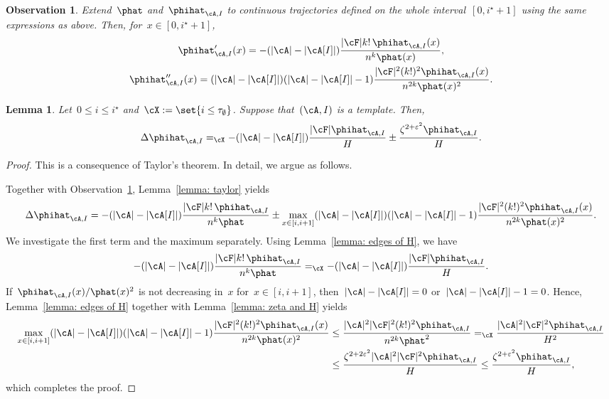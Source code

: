 \documentclass[11pt]{amsart}
\newcommand{\eps}{\varepsilon}
\DeclarePairedDelimiter{\abs}{\lvert}{\rvert}
\newcommand{\Xeq}{=_{\cX}}
\newtheorem{lemma}[algocf]{Lemma}
\newtheorem{observation}[algocf]{Observation}
\theoremstyle{definition}
\numberwithin{equation}{section}
\begin{document}
	
	\begin{observation}\label{observation: derivative phihat}
		Extend~$\phat$ and~$\phihat_{\cA,I}$ to continuous trajectories defined on the whole interval~$[0,i^\star+1]$ using the same expressions as above.
		Then, for~$x\in [0,i^\star+1]$,
		\begin{equation*}
			\begin{gathered}
				\phihat_{\cA,I}'(x)=-(\abs{\cA}-\abs{\cA[I]})\frac{\abs{\cF}k!\,\phihat_{\cA,I}(x)}{n^k\phat(x)},\\
				\phihat_{\cA,I}''(x)=(\abs{\cA}-\abs{\cA[I]})(\abs{\cA}-\abs{\cA[I]}-1)\frac{\abs{\cF}^2(k!)^2\phihat_{\cA,I}(x)}{n^{2k}\phat(x)^2}.
			\end{gathered}
		\end{equation*} 
	\end{observation}
	
	\begin{lemma}\label{lemma: delta phihat}
		Let~$0\leq i\leq i^\star$ and~$\cX:=\set{i\leq \tau_\emptyset}$.
		Suppose that~$(\cA,I)$ is a template.
		Then,
		\begin{equation*}
			\Delta \phihat_{\cA,I}\Xeq -(\abs{\cA}-\abs{\cA[I]})\frac{\abs{\cF}\phihat_{\cA,I}}{H}\pm \frac{\zeta^{2+\eps^2}\phihat_{\cA,I}}{H}.
		\end{equation*}
	\end{lemma}
	
	\begin{proof}
		This is a consequence of Taylor's theorem.
		In detail, we argue as follows.
		
		Together with Observation~\ref{observation: derivative phihat}, Lemma~\ref{lemma: taylor} yields
		\begin{equation*}
			\Delta\phihat_{\cA,I}
			=-(\abs{\cA}-\abs{\cA[I]})\frac{\abs{\cF}k!\,\phihat_{\cA,I}}{n^k\phat}\pm \max_{x\in[i,i+1]}(\abs{\cA}-\abs{\cA[I]})(\abs{\cA}-\abs{\cA[I]}-1)\frac{\abs{\cF}^2(k!)^2\phihat_{\cA,I}(x)}{n^{2k}\phat(x)^2}.
		\end{equation*}
		We investigate the first term and the maximum separately.
		Using Lemma~\ref{lemma: edges of H}, we have
		\begin{equation*}
			-(\abs{\cA}-\abs{\cA[I]})\frac{\abs{\cF}k!\,\phihat_{\cA,I}}{n^k\phat}
			\Xeq-(\abs{\cA}-\abs{\cA[I]})\frac{\abs{\cF}\phihat_{\cA,I}}{H}.
		\end{equation*}
		If~$\phihat_{\cA,I}(x)/\phat(x)^2$ is not decreasing in~$x$ for~$x\in[i,i+1]$, then~$\abs{\cA}-\abs{\cA[I]}=0$ or~$\abs{\cA}-\abs{\cA[I]}-1=0$.
		Hence, Lemma~\ref{lemma: edges of H} together with Lemma~\ref{lemma: zeta and H} yields
		\begin{align*}
			\max_{x\in[i,i+1]}(\abs{\cA}-\abs{\cA[I]})(\abs{\cA}-\abs{\cA[I]}-1)\frac{\abs{\cF}^2(k!)^2\phihat_{\cA,I}(x)}{n^{2k}\phat(x)^2}
			&\leq \frac{\abs{\cA}^2\abs{\cF}^2(k!)^2\phihat_{\cA,I}}{n^{2k}\phat^2}
			\Xeq \frac{\abs{\cA}^2\abs{\cF}^2\phihat_{\cA,I}}{H^2}\\
			&\leq \frac{\zeta^{2+2\eps^2}\abs{\cA}^2\abs{\cF}^2\phihat_{\cA,I}}{H}
			\leq \frac{\zeta^{2+\eps^2}\phihat_{\cA,I}}{H},
		\end{align*}
		which completes the proof.
	\end{proof}
	
\end{document}

